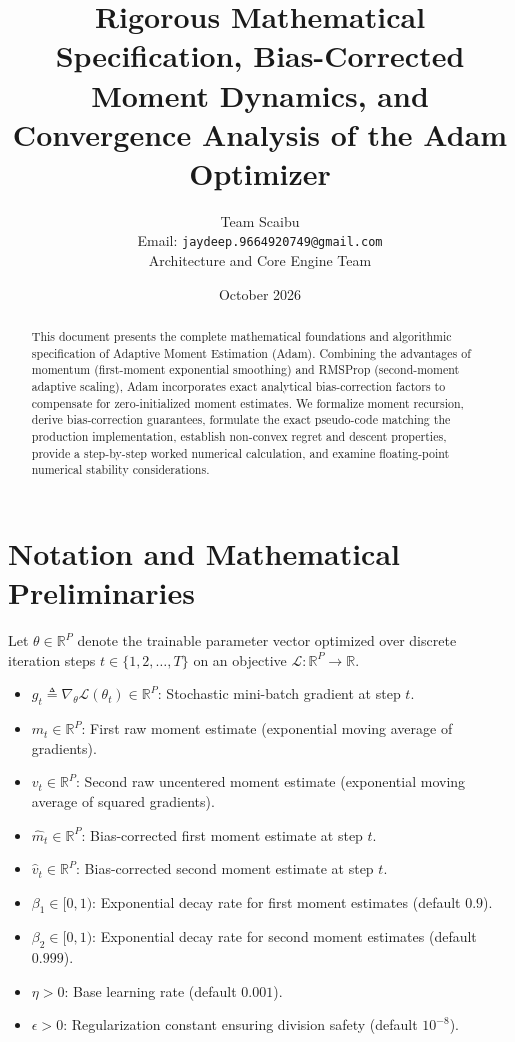 \documentclass[11pt,a4paper]{article}
\title{\textbf{Rigorous Mathematical Specification, Bias-Corrected Moment Dynamics, and Convergence Analysis of the Adam Optimizer}}
\author{Team Scaibu \\ \small Email: \texttt{jaydeep.9664920749@gmail.com} \\ \small Architecture and Core Engine Team}
\date{October 2026}
\theoremstyle{definition}
\begin{document}
\maketitle

\begin{abstract}
This document presents the complete mathematical foundations and algorithmic specification of Adaptive Moment Estimation (Adam). Combining the advantages of momentum (first-moment exponential smoothing) and RMSProp (second-moment adaptive scaling), Adam incorporates exact analytical bias-correction factors to compensate for zero-initialized moment estimates. We formalize moment recursion, derive bias-correction guarantees, formulate the exact pseudo-code matching the production implementation, establish non-convex regret and descent properties, provide a step-by-step worked numerical calculation, and examine floating-point numerical stability considerations.
\end{abstract}

\section{Notation and Mathematical Preliminaries}

Let $\theta \in \mathbb{R}^P$ denote the trainable parameter vector optimized over discrete iteration steps $t \in \{1, 2, \dots, T\}$ on an objective $\mathcal{L}: \mathbb{R}^P \to \mathbb{R}$.

\begin{itemize}
    \item $g_t \triangleq \nabla_\theta \mathcal{L}(\theta_t) \in \mathbb{R}^P$: Stochastic mini-batch gradient at step $t$.
    \item $m_t \in \mathbb{R}^P$: First raw moment estimate (exponential moving average of gradients).
    \item $v_t \in \mathbb{R}^P$: Second raw uncentered moment estimate (exponential moving average of squared gradients).
    \item $\hat{m}_t \in \mathbb{R}^P$: Bias-corrected first moment estimate at step $t$.
    \item $\hat{v}_t \in \mathbb{R}^P$: Bias-corrected second moment estimate at step $t$.
    \item $\beta_1 \in [0, 1)$: Exponential decay rate for first moment estimates (default $0.9$).
    \item $\beta_2 \in [0, 1)$: Exponential decay rate for second moment estimates (default $0.999$).
    \item $\eta > 0$: Base learning rate (default $0.001$).
    \item $\epsilon > 0$: Regularization constant ensuring division safety (default $10^{-8}$).
\end{itemize}
\end{document}
